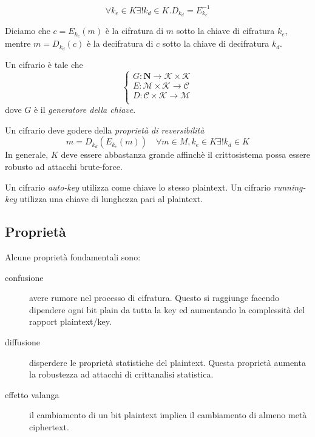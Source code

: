 \begin{equation}
\forall k_{e}\in K \exists! k_{d}\in K . D_{k_{d}}=E_{k_{e}}^{-1}
\end{equation}

Diciamo che $c=E_{k_{e}}(m)$ è la cifratura di $m$ sotto la chiave di cifratura $k_{e}$, mentre $m=D_{k_{d}}(c)$ è la decifratura di $c$ sotto la chiave di decifratura $k_{d}$.

Un cifrario è tale che
\begin{equation}
\begin{cases}
  G: \mathbf{N} \rightarrow \mathcal{K} \times \mathcal{K} \\
  E: \mathcal{M} \times \mathcal{K} \rightarrow \mathcal{C} \\
  D: \mathcal{C} \times \mathcal{K} \rightarrow \mathcal{M} \\
\end{cases}
\end{equation}
dove $G$ è il \textit{generatore della chiave}.

Un cifrario deve godere della \textit{proprietà di reversibilità}
\begin{equation}
m=D_{k_{d}}(E_{k_{e}}(m))\quad \forall m\in M, k_{e}\in K \exists! k_{d}\in K
\end{equation}
In generale, $K$ deve essere abbastanza grande affinchè il crittosistema possa essere robusto ad attacchi brute-force.

Un cifrario \textit{auto-key} utilizza come chiave lo stesso plaintext.
Un cifrario \textit{running-key} utilizza una chiave di lunghezza pari al plaintext.


\subsection{Proprietà}
Alcune proprietà fondamentali sono:
\begin{description}
	\item[confusione] avere rumore nel processo di cifratura. Questo si raggiunge facendo dipendere ogni bit plain da tutta la key ed aumentando la complessità del rapport plaintext/key.
	\item[diffusione] disperdere le proprietà statistiche del plaintext. Questa proprietà aumenta la robustezza ad attacchi di crittanalisi statistica.
	\item[effetto valanga] il cambiamento di un bit plaintext implica il cambiamento di almeno metà ciphertext.
\end{description}


